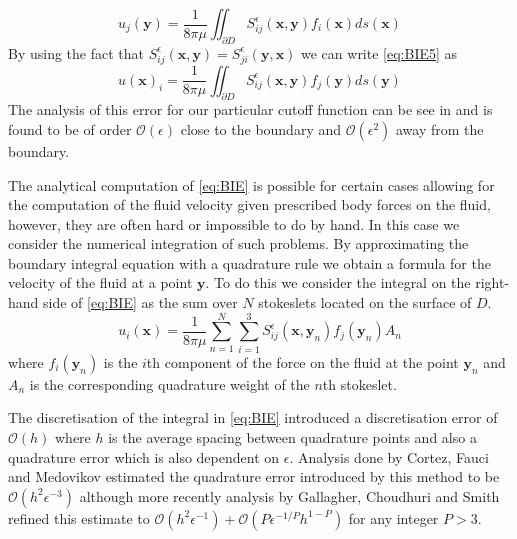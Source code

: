\begin{equation}
    u_j(\bm{y}) = \frac{1}{8 \pi \mu} \iint_{\partial D} S_{i j}^{\epsilon}\left(\bm{x}, \bm{y}\right) f_{i}(\bm{x}) d s(\bm{x})
\end{equation}
By using the fact that $S_{i j}^{\epsilon}\left(\bm{x}, \bm{y}\right) = S_{j i}^{\epsilon}\left(\bm{y}, \bm{x}\right)$ we can write \cref{eq:BIE5} as 
\begin{equation}
  \label{eq:BIE}
    u(\bm{x})_i=\frac{1}{8 \pi \mu} \iint_{\partial D} S_{i j}^{\epsilon}\left(\bm{x}, \bm{y}\right) f_{j}(\bm{y}) d s(\bm{y})
\end{equation}
The analysis of this error for our particular cutoff function can be see in \cite{Cortez2005} and is found to be of order $\mathcal{O}(\epsilon)$ close to the boundary and $\mathcal{O}(\epsilon^2)$ away from the boundary.

The analytical computation of \cref{eq:BIE} is possible for certain cases allowing for the computation of the fluid velocity given prescribed body forces on the fluid, however, they are often hard or impossible to do by hand. In this case we consider the numerical integration of such problems. By approximating the boundary integral equation with a quadrature rule we obtain a formula for the velocity of the fluid at a point $\bm{y}$. To do this we consider the integral on the right-hand side of \cref{eq:BIE} as the sum over $N$ stokeslets located on the surface of $D$. 
\begin{equation}
\label{eq:Stokesletsum}
    u_{i}\left(\bm{x}\right)=\frac{1}{8 \pi \mu} \sum_{n=1}^{N} \sum_{i=1}^{3} S_{i j}^{\epsilon}\left(\bm{x}, {\bm{y}}_{n}\right) {f}_{j}({\bm{y}}_{n}) A_{n}
\end{equation}
where ${f}_{i}({\bm{y}}_n)$ is the $i$th component of the force on the fluid at the point ${\bm{y}}_n$ and $A_n$ is the corresponding quadrature weight of the $n$th stokeslet.

The discretisation of the integral in \cref{eq:BIE} introduced a discretisation error of $\mathcal{O}(h)$ where $h$ is the average spacing between quadrature points and also a quadrature error which is also dependent on $\epsilon$. Analysis done by Cortez, Fauci and Medovikov \cite{Cortez2005} estimated the quadrature error introduced by this method to be $\mathcal{O}(h^2\epsilon^{-3})$ although more recently analysis by Gallagher, Choudhuri and Smith \cite{Gallagher2019SharpEquation} refined this estimate to $\mathcal{O}(h^2\epsilon^{-1}) + \mathcal{O}(P\epsilon^{-1/P} h^{1-P})$ for any integer $P>3$.

